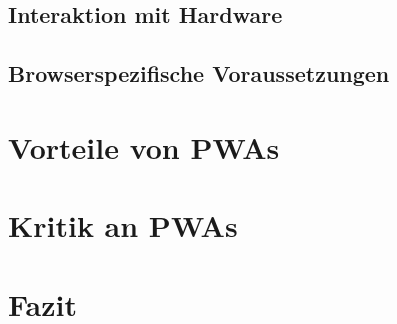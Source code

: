 \documentclass[11pt, parskip=half]{scrartcl}       %
\begin{document}
\subsection{Interaktion mit Hardware}

\subsection{Browserspezifische Voraussetzungen}


\section{Vorteile von PWAs}

\section{Kritik an PWAs}


\section{Fazit}

\newpage

\printbibliography
\end{document}
